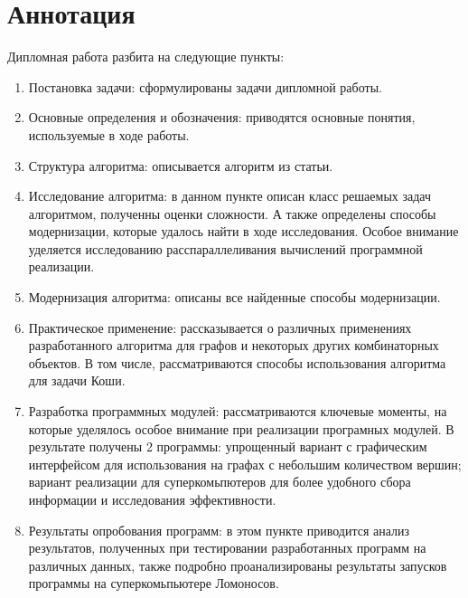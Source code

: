 \section*{Аннотация}
\label{sec:Annotation} 
\large

Дипломная работа разбита на следующие пункты:
\begin{enumerate}
\item Постановка задачи: сформулированы задачи дипломной работы.
\item Основные определения и обозначения: приводятся основные понятия, используемые в ходе работы.
\item Структура алгоритма: описывается алгоритм из статьи.
\item Исследование алгоритма: в данном пункте описан класс решаемых задач алгоритмом, полученны оценки сложности. А также определены способы модернизации, которые удалось найти в ходе исследования. Особое внимание уделяется исследованию расспараллеливания вычислений программной реализации.
\item Модернизация алгоритма: описаны все найденные способы модернизации.
\item Практическое применение: рассказывается о различных применениях разработанного алгоритма для графов и некоторых других комбинаторных объектов. В том числе, рассматриваются способы использования алгоритма для задачи Коши.
\item Разработка программных модулей: рассматриваются ключевые моменты, на которые уделялось особое внимание при реализации програмных модулей. В результате получены 2 программы: упрощенный вариант с графическим интерфейсом для использования на графах с небольшим количеством вершин; вариант реализации для суперкомьпютеров для более удобного сбора информации и исследования эффективности.
\item Результаты опробования программ: в этом пункте приводится анализ результатов, полученных при тестировании разработанных программ на различных данных, также подробно проанализированы результаты запусков программы на суперкомьпьютере Ломоносов.
\end{enumerate}